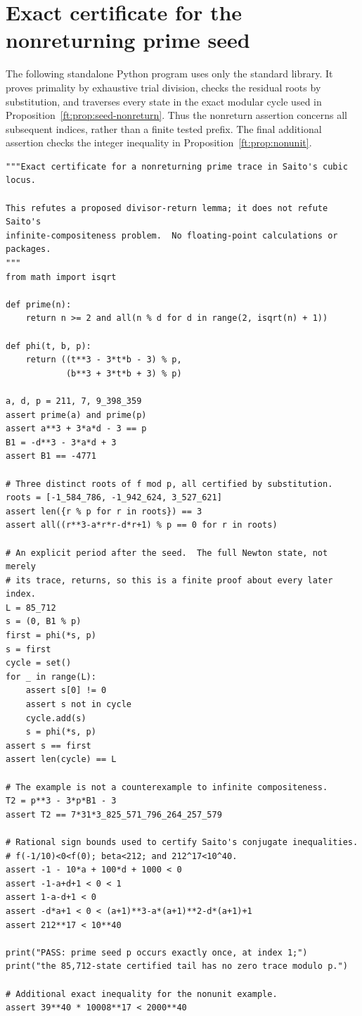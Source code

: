 \documentclass[11pt,a4paper]{article}
\theoremstyle{definition}
\theoremstyle{remark}
\numberwithin{equation}{section}
\begin{document}
\clearpage
{}

\section{Exact certificate for the nonreturning prime seed}
\label{ft:app:seed-verifier}

The following standalone Python program uses only the standard library.
It proves primality by exhaustive trial division, checks the residual
roots by substitution, and traverses every state in the exact modular
cycle used in Proposition~\ref{ft:prop:seed-nonreturn}. Thus the
nonreturn assertion concerns all subsequent indices, rather than a
finite tested prefix. The final additional assertion checks the integer
inequality in Proposition~\ref{ft:prop:nonunit}.


\begin{lstlisting}
"""Exact certificate for a nonreturning prime trace in Saito's cubic locus.

This refutes a proposed divisor-return lemma; it does not refute Saito's
infinite-compositeness problem.  No floating-point calculations or packages.
"""
from math import isqrt

def prime(n):
    return n >= 2 and all(n % d for d in range(2, isqrt(n) + 1))

def phi(t, b, p):
    return ((t**3 - 3*t*b - 3) % p,
            (b**3 + 3*t*b + 3) % p)

a, d, p = 211, 7, 9_398_359
assert prime(a) and prime(p)
assert a**3 + 3*a*d - 3 == p
B1 = -d**3 - 3*a*d + 3
assert B1 == -4771

# Three distinct roots of f mod p, all certified by substitution.
roots = [-1_584_786, -1_942_624, 3_527_621]
assert len({r % p for r in roots}) == 3
assert all((r**3-a*r*r-d*r+1) % p == 0 for r in roots)

# An explicit period after the seed.  The full Newton state, not merely
# its trace, returns, so this is a finite proof about every later index.
L = 85_712
s = (0, B1 % p)
first = phi(*s, p)
s = first
cycle = set()
for _ in range(L):
    assert s[0] != 0
    assert s not in cycle
    cycle.add(s)
    s = phi(*s, p)
assert s == first
assert len(cycle) == L

# The example is not a counterexample to infinite compositeness.
T2 = p**3 - 3*p*B1 - 3
assert T2 == 7*31*3_825_571_796_264_257_579

# Rational sign bounds used to certify Saito's conjugate inequalities.
# f(-1/10)<0<f(0); beta<212; and 212^17<10^40.
assert -1 - 10*a + 100*d + 1000 < 0
assert -1-a+d+1 < 0 < 1
assert 1-a-d+1 < 0
assert -d*a+1 < 0 < (a+1)**3-a*(a+1)**2-d*(a+1)+1
assert 212**17 < 10**40

print("PASS: prime seed p occurs exactly once, at index 1;")
print("the 85,712-state certified tail has no zero trace modulo p.")

# Additional exact inequality for the nonunit example.
assert 39**40 * 10008**17 < 2000**40
\end{lstlisting}
\end{document}
